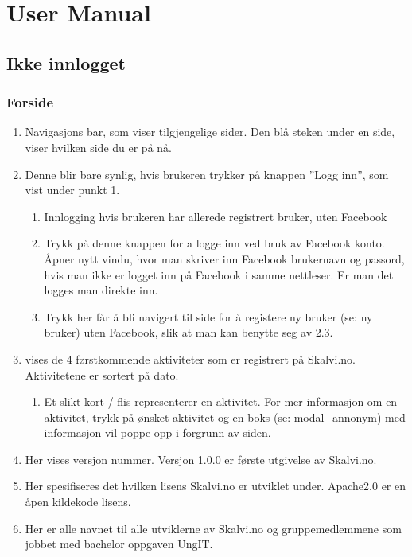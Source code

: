 \chapter{User Manual}
\label{user_manual}

\section{Ikke innlogget}

\subsection{Forside}
\begin{center}
\end{center}
\begin{enumerate}[nosep]
    \item Navigasjons bar, som viser tilgjengelige sider. Den blå steken under en side, viser hvilken side du er på nå.
    \item Denne blir bare synlig, hvis brukeren trykker på knappen ”Logg inn”, som vist under punkt 1.
    \begin{enumerate}
        \item Innlogging hvis brukeren har allerede registrert bruker, uten Facebook
        \item Trykk på denne knappen for a logge inn ved bruk av Facebook konto. Åpner nytt vindu, hvor man skriver inn Facebook brukernavn og passord, hvis man ikke er logget inn på Facebook i samme nettleser. Er man det logges man direkte inn.
        \item Trykk her får å bli navigert til side for å registere ny bruker (se: ny bruker) uten Facebook, slik at man kan benytte seg av 2.3.
    \end{enumerate}
    \item vises de 4 førstkommende aktiviteter som er registrert på Skalvi.no. Aktivitetene er sortert på dato. 
    \begin{enumerate}
        \item Et slikt kort / flis representerer en aktivitet. For mer informasjon om en aktivitet, trykk på ønsket aktivitet og en boks (se: modal\_annonym) med informasjon vil poppe opp i forgrunn av siden.
    \end{enumerate}
    \item Her vises versjon nummer. Versjon 1.0.0 er første utgivelse av Skalvi.no.
    \item Her spesifiseres det hvilken lisens Skalvi.no er utviklet under. Apache2.0 er en åpen kildekode lisens.
    \item Her er alle navnet til alle utviklerne av Skalvi.no og gruppemedlemmene som jobbet med bachelor oppgaven UngIT.

\end{enumerate}

